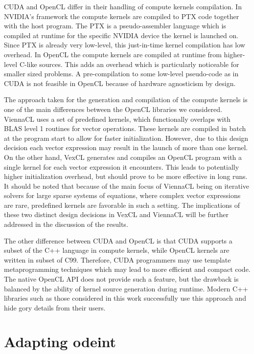 \documentclass[final]{siamltex}
\begin{document}
CUDA and OpenCL differ in their handling of compute kernels compilation. In
NVIDIA's framework the compute kernels are compiled to PTX code together with
the host program. The PTX is a pseudo-assembler language which is compiled at
runtime for the specific NVIDIA device the kernel is launched on. Since PTX is already
very low-level, this just-in-time kernel compilation has low overhead. In
OpenCL the compute kernels are compiled at runtime from higher-level C-like sources.
This adds an overhead which is particularly noticeable for smaller sized
problems. A pre-compilation to some low-level pseudo-code as in CUDA is not feasible in
OpenCL because of hardware agnosticism by design.

The approach taken for the generation and compilation of the compute kernels is one of the
main differences between the OpenCL libraries we considered. 
ViennaCL uses a set of predefined kernels, which functionally overlaps with BLAS level
1 routines for vector operations. 
These kernels are compiled in batch at the program start to allow
for faster initialization. However, due to this design decision each vector
expression may result in the launch of more than one kernel.  On the other hand,
VexCL generates and compiles an OpenCL program with a single kernel for each
vector expression it encounters.  This leads to potentially higher
initialization overhead, but should prove to be more effective in long
runs. It should be noted that because of the main focus of ViennaCL being on iterative
solvers for large sparse systems of equations, where complex vector
expressions are rare, predefined kernels are favorable in such a setting.
The implications of these two distinct design decisions in VexCL and ViennaCL will be further addressed in the discussion of the results.

The other difference between CUDA and OpenCL is that CUDA supports a subset of the
C++ language in compute kernels, while OpenCL kernels are written in subset of
C99. Therefore, CUDA programmers may use template metaprogramming techniques
which may lead to more efficient and compact code. The native OpenCL API does not
provide such a feature, but the drawback is balanced by the ability of
kernel source generation during runtime. Modern C++ libraries such as those considered in
this work successfully use this approach and hide gory details from their
users.




%
%
\section{Adapting odeint} \label{sec:adapting-odeint}
\end{document}
